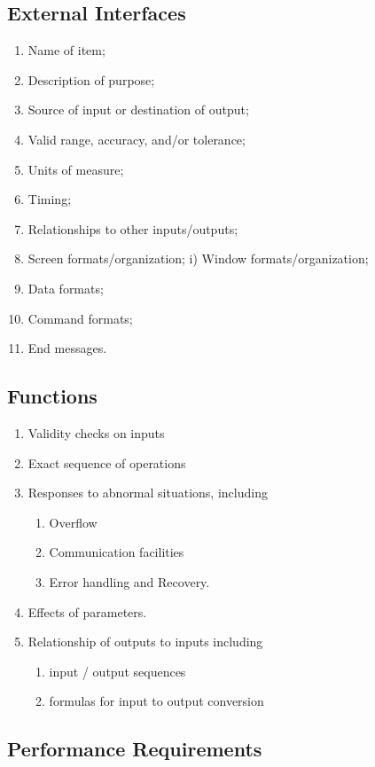 \documentclass[onecolumn, draftclsnofoot,10pt, compsoc]{IEEEtran}
\begin{document}
\subsection{External Interfaces}
\begin{enumerate}
\item Name of item; 
\item Description of purpose; 
\item Source of input or destination of output; 
\item Valid range, accuracy, and/or tolerance; 
\item Units of measure; 
\item Timing; 
\item Relationships to other inputs/outputs; 
\item Screen formats/organization; i) Window formats/organization; 
\item Data formats; 
\item Command formats; 
\item End messages.
\end{enumerate}

\subsection{Functions}

\begin{enumerate}
\item Validity checks on inputs 
\item Exact sequence of operations
\item Responses to abnormal situations, including \begin{enumerate}
\item Overflow
\item Communication facilities
\item Error handling and Recovery.
\end{enumerate}
\item Effects of parameters.
\item Relationship of outputs to inputs including
\begin{enumerate}
\item input / output sequences
\item formulas for input to output conversion
\end{enumerate}
\end{enumerate}

\subsection{Performance Requirements}
\end{document}
